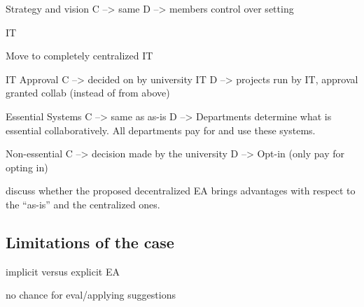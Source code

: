 
Strategy and vision
 C --> same
 D --> members control over setting

IT 

Move to completely centralized IT

IT Approval
 C --> decided on by university IT
 D --> projects run by IT, approval granted collab (instead of from above)

Essential Systems 
 C --> same as as-is
 D --> Departments determine what is essential collaboratively. All departments pay for and use these systems.

Non-essential
 C --> decision made by the university
 D --> Opt-in (only pay for opting in)

discuss whether the proposed decentralized EA brings advantages with respect to the ``as-is'' and the centralized ones. 

\subsection{Limitations of the case}

implicit versus explicit EA

no chance for eval/applying suggestions




  